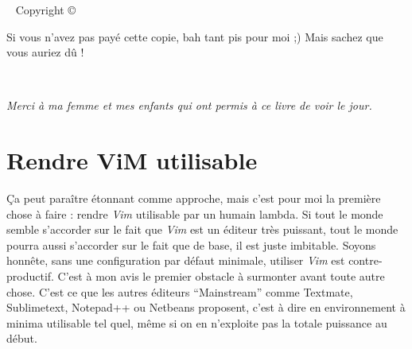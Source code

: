 



\frontmatter

\blankpage

\maketitle


\newpage
\begin{fullwidth}
~\vfill
\thispagestyle{empty}
\setlength{\parindent}{0pt}
\setlength{\parskip}{\baselineskip}
Copyright \copyright\ \the\year\ \thanklessauthor

\par{}

\par{}

\par Si vous n'avez pas payé cette copie, bah tant pis pour moi ;) Mais sachez que vous auriez dû !

\end{fullwidth}

\tableofcontents

\listoffigures

\listoftables

\cleardoublepage
~\vfill
\begin{doublespace}
\noindent\fontsize{18}{22}\selectfont\itshape
\nohyphenation
Merci à ma femme et mes enfants qui ont permis à ce livre de voir le jour.
\end{doublespace}
\vfill
\vfill

\cleardoublepage



\chapter{Rendre ViM utilisable}

Ça peut paraître étonnant comme approche, mais c'est pour moi la première chose à faire : rendre \emph{Vim} utilisable par un humain lambda. Si tout le monde semble s'accorder sur le fait que \emph{Vim} est un éditeur très puissant, tout le monde pourra aussi s'accorder sur le fait que de base, il est juste imbitable. Soyons honnête, sans une configuration par défaut minimale, utiliser \emph{Vim} est contre-productif. C'est à mon avis le premier obstacle à surmonter avant toute autre chose. C'est ce que les autres éditeurs ``Mainstream'' comme Textmate, Sublimetext, Notepad++ ou Netbeans proposent, c'est à dire en environnement à minima utilisable tel quel, même si on en n'exploite pas la totale puissance au début.

